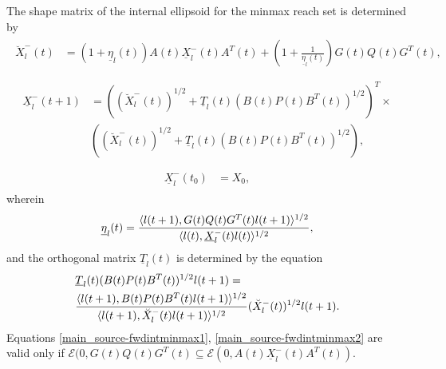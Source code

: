 \documentclass[letterpaper,10pt,english]{sphinxmanual}
\begin{document}
The shape matrix of the internal ellipsoid for the minmax reach set is
determined by
\label{main_source:equation-fwdintminmax1}\begin{gather}
\begin{split}\breve{X}^-_l(t) & = (1+\underline{\eta}_l(t))A(t)\underline{X}^-_l(t)A^T(t) +
\left(1+\frac{1}{\underline{\eta}_l(t)}\right)
G(t)Q(t)G^T(t),\\\end{split}\label{main_source-fwdintminmax1}
\end{gather}\label{main_source:equation-fwdintminmax2}\begin{gather}
\begin{split}\underline{X}^-_l(t+1) & = \left((\breve{X}^-_l(t))^{1/2} +
\underline{T}_l(t)(B(t)P(t)B^T(t))^{1/2}\right)^T
\times \nonumber \\
&\left((\breve{X}^-_l(t))^{1/2} + \underline{T}_l(t)(B(t)P(t)B^T(t))^{1/2}\right),\\\end{split}\label{main_source-fwdintminmax2}
\end{gather}\label{main_source:equation-fwdintminmax3}\begin{gather}
\begin{split}\underline{X}^-_l(t_0) & = X_0,\end{split}\label{main_source-fwdintminmax3}
\end{gather}
wherein
\begin{gather}
\begin{split}\underline{\eta}_l(t) = \frac{\langle l(t+1),
G(t)Q(t)G^T(t)l(t+1)\rangle^{1/2}}{\langle l(t),
\underline{X}^-_l(t)l(t)\rangle^{1/2}},\end{split}\notag
\end{gather}
and the orthogonal matrix $\underline{T}_l(t)$ is determined by
the equation
\begin{gather}
\begin{split}\begin{aligned}
&\underline{T}_l(t)(B(t)P(t)B^T(t))^{1/2}l(t+1) = \\
& \frac{\langle l(t+1),
B(t)P(t)B^T(t)l(t+1)\rangle^{1/2}}{\langle l(t+1),
\breve{X}^-_l(t)l(t+1)\rangle^{1/2}}(\breve{X}^-_l(t))^{1/2}l(t+1).\end{aligned}\end{split}\notag
\end{gather}
Equations \eqref{main_source-fwdintminmax1}, \eqref{main_source-fwdintminmax2} are valid only if
${\mathcal E}(0,G(t)Q(t)G^T(t)\subseteq{\mathcal E}(0,A(t)\underline{X}^-_l(t)A^T(t))$.
\end{document}
